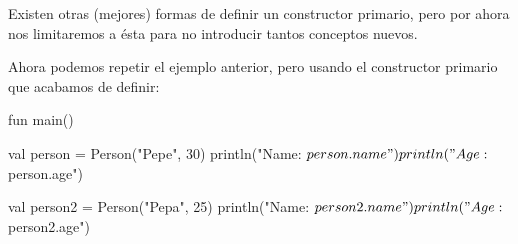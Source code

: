     \begin{note}
      Existen otras (mejores) formas de definir un constructor primario, pero por ahora nos 
      limitaremos a ésta para no introducir tantos conceptos nuevos.
    \end{note}

    Ahora podemos repetir el ejemplo anterior, pero usando el constructor primario que acabamos de
    definir:

    \begin{kotlin}
      fun main() {
        val person = Person("Pepe", 30)
        println("Name: ${person.name}")
        println("Age: ${person.age}")
        
        val person2 = Person("Pepa", 25)
        println("Name: ${person2.name}")
        println("Age: ${person2.age}")
      }
    \end{kotlin}